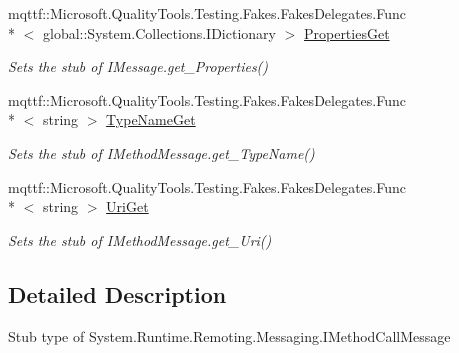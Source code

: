 \begin{DoxyCompactItemize}
mqttf\-::\-Microsoft.\-Quality\-Tools.\-Testing.\-Fakes.\-Fakes\-Delegates.\-Func\\*
$<$ global\-::\-System.\-Collections.\-I\-Dictionary $>$ \hyperlink{class_system_1_1_runtime_1_1_remoting_1_1_messaging_1_1_fakes_1_1_stub_i_method_call_message_a7240607efeabfb449c6bad358b684064}{Properties\-Get}
\begin{DoxyCompactList}\small\item\em Sets the stub of I\-Message.\-get\-\_\-\-Properties()\end{DoxyCompactList}\item 
mqttf\-::\-Microsoft.\-Quality\-Tools.\-Testing.\-Fakes.\-Fakes\-Delegates.\-Func\\*
$<$ string $>$ \hyperlink{class_system_1_1_runtime_1_1_remoting_1_1_messaging_1_1_fakes_1_1_stub_i_method_call_message_adbd188105e61252edcdf9fa925a26815}{Type\-Name\-Get}
\begin{DoxyCompactList}\small\item\em Sets the stub of I\-Method\-Message.\-get\-\_\-\-Type\-Name()\end{DoxyCompactList}\item 
mqttf\-::\-Microsoft.\-Quality\-Tools.\-Testing.\-Fakes.\-Fakes\-Delegates.\-Func\\*
$<$ string $>$ \hyperlink{class_system_1_1_runtime_1_1_remoting_1_1_messaging_1_1_fakes_1_1_stub_i_method_call_message_a2e7d3f7e5aa0bb10e7468cfa556f806e}{Uri\-Get}
\begin{DoxyCompactList}\small\item\em Sets the stub of I\-Method\-Message.\-get\-\_\-\-Uri()\end{DoxyCompactList}\end{DoxyCompactItemize}


\subsection{Detailed Description}
Stub type of System.\-Runtime.\-Remoting.\-Messaging.\-I\-Method\-Call\-Message



